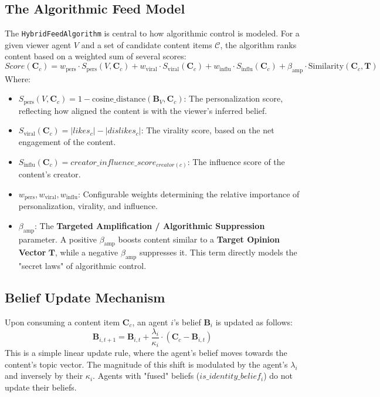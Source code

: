 \documentclass[10pt,a4paper]{article}
\newcommand{\belief}{\mathbf{B}}
\newcommand{\contentvec}{\mathbf{C}}
\newcommand{\learningrate}{\lambda}
\newcommand{\conviction}{\kappa}
\newcommand{\wpers}{w_{\text{pers}}}
\newcommand{\wviral}{w_{\text{viral}}}
\newcommand{\winflu}{w_{\text{influ}}}
\newcommand{\Spers}{S_{\text{pers}}}
\newcommand{\Sviral}{S_{\text{viral}}}
\newcommand{\Sinflu}{S_{\text{influ}}}
\newcommand{\betaamp}{\beta_{\text{amp}}}
\newcommand{\Starget}{\mathbf{T}}
\begin{document}
\subsection{The Algorithmic Feed Model}
The \texttt{HybridFeedAlgorithm} is central to how algorithmic control is modeled. For a given viewer agent $V$ and a set of candidate content items $\mathcal{C}$, the algorithm ranks content based on a weighted sum of several scores:
\begin{equation}
    Score(\contentvec_c) = \wpers \cdot \Spers(V, \contentvec_c) + \wviral \cdot \Sviral(\contentvec_c) + \winflu \cdot \Sinflu(\contentvec_c) + \betaamp \cdot \text{Similarity}(\contentvec_c, \Starget)
\end{equation}
Where:
\begin{itemize}
    \item $\Spers(V, \contentvec_c) = 1 - \text{cosine\_distance}(\belief_V, \contentvec_c)$: The personalization score, reflecting how aligned the content is with the viewer's inferred belief.
    \item $\Sviral(\contentvec_c) = |likes_c| - |dislikes_c|$: The virality score, based on the net engagement of the content.
    \item $\Sinflu(\contentvec_c) = creator\_influence\_score_{creator(c)}$: The influence score of the content's creator.
    \item $\wpers, \wviral, \winflu$: Configurable weights determining the relative importance of personalization, virality, and influence.
    \item $\betaamp$: The \textbf{Targeted Amplification / Algorithmic Suppression} parameter. A positive $\betaamp$ boosts content similar to a \textbf{Target Opinion Vector} $\Starget$, while a negative $\betaamp$ suppresses it. This term directly models the "secret laws" of algorithmic control.
\end{itemize}

\subsection{Belief Update Mechanism}
Upon consuming a content item $\contentvec_c$, an agent $i$'s belief $\belief_i$ is updated as follows:
\begin{equation}
    \belief_{i, t+1} = \belief_{i, t} + \frac{\learningrate_i}{\conviction_i} \cdot (\contentvec_c - \belief_{i, t})
\end{equation}
This is a simple linear update rule, where the agent's belief moves towards the content's topic vector. The magnitude of this shift is modulated by the agent's $\learningrate_i$ and inversely by their $\conviction_i$. Agents with "fused" beliefs ($is\_identity\_belief_i$) do not update their beliefs.
\end{document}
